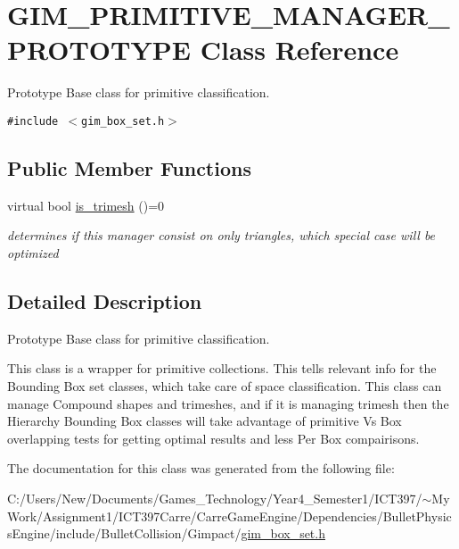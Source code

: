 \hypertarget{class_g_i_m___p_r_i_m_i_t_i_v_e___m_a_n_a_g_e_r___p_r_o_t_o_t_y_p_e}{
\section{GIM\_\-PRIMITIVE\_\-MANAGER\_\-PROTOTYPE Class Reference}
\label{class_g_i_m___p_r_i_m_i_t_i_v_e___m_a_n_a_g_e_r___p_r_o_t_o_t_y_p_e}
}
Prototype Base class for primitive classification.  


{\tt \#include $<$gim\_\-box\_\-set.h$>$}

\subsection*{Public Member Functions}
\begin{CompactItemize}
\item 
\hypertarget{class_g_i_m___p_r_i_m_i_t_i_v_e___m_a_n_a_g_e_r___p_r_o_t_o_t_y_p_e_aad51538aaf2c2652c7e202a9f2d57a5}{
virtual bool \hyperlink{class_g_i_m___p_r_i_m_i_t_i_v_e___m_a_n_a_g_e_r___p_r_o_t_o_t_y_p_e_aad51538aaf2c2652c7e202a9f2d57a5}{is\_\-trimesh} ()=0}
\label{class_g_i_m___p_r_i_m_i_t_i_v_e___m_a_n_a_g_e_r___p_r_o_t_o_t_y_p_e_aad51538aaf2c2652c7e202a9f2d57a5}

\begin{CompactList}\small\item\em determines if this manager consist on only triangles, which special case will be optimized \item\end{CompactList}\end{CompactItemize}


\subsection{Detailed Description}
Prototype Base class for primitive classification. 

This class is a wrapper for primitive collections. This tells relevant info for the Bounding Box set classes, which take care of space classification. This class can manage Compound shapes and trimeshes, and if it is managing trimesh then the Hierarchy Bounding Box classes will take advantage of primitive Vs Box overlapping tests for getting optimal results and less Per Box compairisons. 

The documentation for this class was generated from the following file:\begin{CompactItemize}
\item 
C:/Users/New/Documents/Games\_\-Technology/Year4\_\-Semester1/ICT397/$\sim$My Work/Assignment1/ICT397Carre/CarreGameEngine/Dependencies/BulletPhysicsEngine/include/BulletCollision/Gimpact/\hyperlink{gim__box__set_8h}{gim\_\-box\_\-set.h}\end{CompactItemize}
